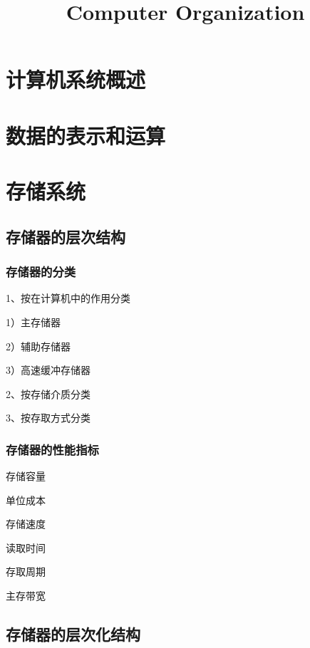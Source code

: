 \documentclass{ctexart}
\title{Computer Organization}
\author{}
\date{}
\begin{document}
\maketitle

\newpage

\tableofcontents

\section{计算机系统概述}





\section{数据的表示和运算}




\section{存储系统}

\subsection{存储器的层次结构}
\subsubsection{存储器的分类}
1、按在计算机中的作用分类

1）主存储器

2）辅助存储器

3）高速缓冲存储器

2、按存储介质分类

3、按存取方式分类

\subsubsection{存储器的性能指标}

存储容量

单位成本

存储速度

读取时间

存取周期

主存带宽

\subsection{存储器的层次化结构}
\end{document}
